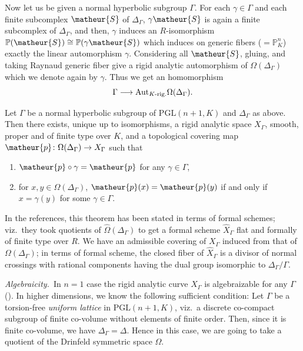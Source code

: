 Now let us be given a normal hyperbolic subgroup $\Gamma$.
For each $\gamma\in\Gamma$ and each finite subcomplex $\matheur{S}$ of
$\Delta_{\Gamma}$, $\gamma\matheur{S}$ is again a finite subcomplex of
$\Delta_{\Gamma}$, and then, $\gamma$ induces an $R$-isomorphism 
$\mathbb{P}(\matheur{S})\cong\mathbb{P}(\gamma\matheur{S})$ which
induces on generic fibers ($=\mathbb{P}^n_K$) exactly the linear 
automorphism $\gamma$.
Considering all $\matheur{S}$, gluing, and taking Raynaud generic fiber
give a rigid analytic automorphism of $\Omega(\Delta_{\Gamma})$ which 
we denote again by $\gamma$.
Thus we get an homomorphism 
$$
\Gamma\longrightarrow\mathrm{Aut}_{K\textrm{\scriptsize{-rig.}}}
\Omega(\Delta_{\Gamma}).
$$

\begin{appthm}
Let $\Gamma$ be a normal hyperbolic subgroup of $\mathrm{PGL}(n+1,K)$
and $\Delta_{\Gamma}$ as above.
Then there exists, unique up to isomorphisms,
a rigid analytic space $X_{\Gamma}$, smooth, proper and of finite type
over $K$, and a topological covering map $\matheur{p}\colon
\Omega(\Delta_{\Gamma})\rightarrow X_{\Gamma}$ such that
\begin{enumerate}
\item $\matheur{p}\circ\gamma=\matheur{p}$ for any $\gamma\in\Gamma$,
\item for $x,y\in\Omega(\Delta_{\Gamma})$, $\matheur{p}(x)=\matheur{p}
(y)$ if and only if $x=\gamma(y)$ for some $\gamma\in\Gamma$.
\end{enumerate}
\end{appthm}

In the references, this theorem has been stated in terms of formal
schemes; viz.\ they took quotients of
$\widehat{\Omega}(\Delta_{\Gamma})$ to get a formal scheme 
$\widehat{X}_{\Gamma}$ flat and formally of finite type over $R$.
We have an admissible covering of $X_{\Gamma}$ induced from that of 
$\Omega(\Delta_{\Gamma})$; in terms of formal scheme, the closed fiber
of $\widehat{X}_{\Gamma}$ is a divisor of normal crossings with rational
components having the dual group isomorphic to $\Delta_{\Gamma}/\Gamma$.

\vspace{1ex}
{\it Algebraicity.}\ In $n=1$ case the rigid analytic curve $X_{\Gamma}$
is algebraizable for any $\Gamma$ (\cite{aacodcoclr}).
In higher dimensions, we know the following sufficient condition:
Let $\Gamma$ be a torsion-free {\it uniform lattice} in 
$\mathrm{PGL}(n+1,K)$, viz.\ a
discrete co-compact subgroup of finite co-volume without elements of 
finite order.
Then, since it is finite co-volume, we have $\Delta_{\Gamma}=\Delta$.
Hence in this case, we are going to take a quotient of the Drinfeld
symmetric space $\Omega$.

